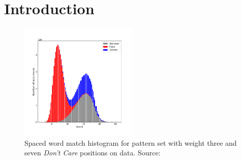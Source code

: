 \chapter{Introduction}


\begin{figure}
	\centering
	\includegraphics[width=0.5\textwidth]{images/w_3-d_7-hist.png}
	\caption{Spaced word match histogram for pattern set with weight three and seven \textit{Don't Care} positions on \bb data. Source: \cite{hundt2020praktkium}}
	\label{fig:spamogram}
\end{figure}

